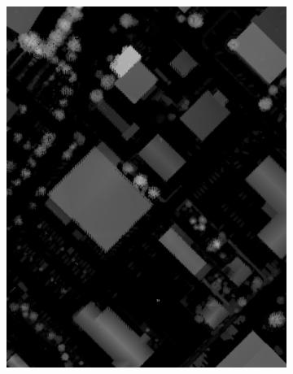\begin{figure}[htb]
\begin{subfigure}{0.19\textwidth}
  \includegraphics[width=1\linewidth]{fig/vai/32_hm.jpg}
\end{subfigure}
\begin{subfigure}{0.19\textwidth}
  \centering

\end{subfigure}
\end{figure}
